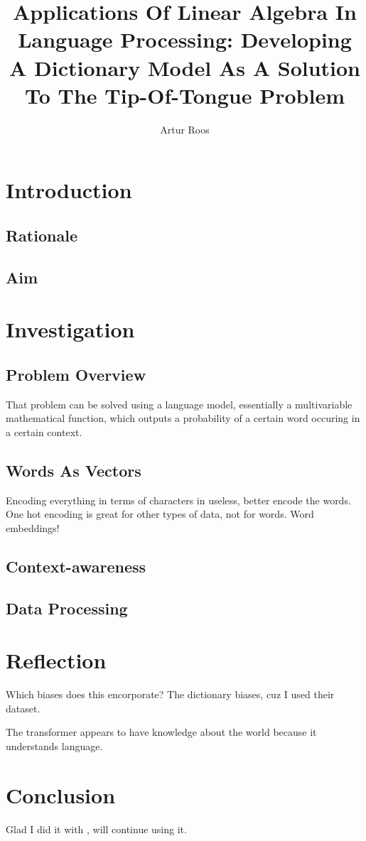\documentclass[14pt]{article}
\title{\textbf{Applications Of Linear Algebra In Language Processing: Developing A Dictionary Model As A Solution To The Tip-Of-Tongue Problem}}
\author{Artur Roos}
\begin{document}
\maketitle
\tableofcontents
\clearpage
\begin{multicols}{2}
\section{Introduction}
\subsection{Rationale}
\lipsum[1-6]
\subsection{Aim}
\lipsum[1-6]
\section{Investigation}
\subsection{Problem Overview}
That problem can be solved using a language model, essentially a multivariable mathematical function, which outputs a probability of a certain word occuring in a certain context.
\lipsum[1-6]
\subsection{Words As Vectors}
Encoding everything in terms of characters in useless, better encode the words.
One hot encoding is great for other types of data, not for words. Word embeddings\cite{robmiles-embeddings}!
\subsection{Context-awareness}
\lipsum[1-6]
\subsection{Data Processing}
\lipsum[1-6]
\section{Reflection}
Which biases does this encorporate? The dictionary biases, cuz I used their dataset.

The transformer appears to have knowledge about the world because it understands language.

\lipsum[2]
\section{Conclusion}
Glad I did it with \LaTeXe\cite{latex2e}, will continue using it.
\end{multicols}



\end{document}
